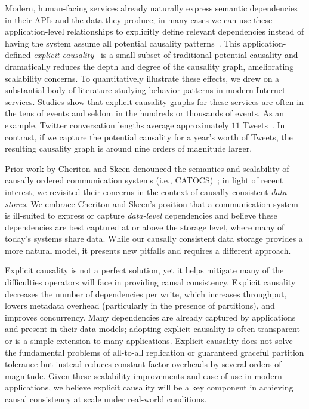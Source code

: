 Modern, human-facing services already naturally express semantic
dependencies in their APIs and the data they produce; in many cases we
can use these application-level relationships to explicitly define
relevant dependencies instead of having the system assume all
potential causality patterns~\cite{explicit-socc}. This
application-defined \textit{explicit
  causality}~\cite{catocs,lazyreplication,fekete99} is a small subset
of traditional potential causality and dramatically reduces the depth
and degree of the causality graph, ameliorating scalability
concerns. To quantitatively illustrate these effects, we drew on a
substantial body of literature studying behavior patterns in modern
Internet services. Studies show that explicit causality graphs for
these services are often in the tens of events and seldom in the
hundreds or thousands of events. As an example, Twitter conversation
lengths average approximately $11$ Tweets~\cite{ritter-twitter-study,
  ye-twitter-study}. In contrast, if we capture the potential
causality for a year's worth of Tweets, the resulting causality graph
is around nine orders of magnitude larger.

Prior work by Cheriton and Skeen denounced the semantics and
scalability of causally ordered communication systems (i.e.,
CATOCS)~\cite{birman-response, catocs}; in light of recent interest,
we revisited their concerns in the context of causally consistent
\textit{data stores}. We embrace Cheriton and Skeen's position that a
communication system is ill-suited to express or capture
\textit{data-level} dependencies and believe these dependencies are
best captured at or above the storage level, where many of today's
systems share data.  While our causally consistent data storage
provides a more natural model, it presents new pitfalls and requires a
different approach.

Explicit causality is not a perfect solution, yet it helps mitigate
many of the difficulties operators will face in providing causal
consistency. Explicit causality decreases the number of dependencies
per write, which increases throughput, lowers metadata overhead
(particularly in the presence of partitions), and improves
concurrency. Many dependencies are already captured by applications
and present in their data models; adopting explicit causality is often
transparent or is a simple extension to many applications. Explicit
causality does not solve the fundamental problems of all-to-all
replication or guaranteed graceful partition tolerance but instead
reduces constant factor overheads by several orders of
magnitude. Given these scalability improvements and ease of use in
modern applications, we believe explicit causality will be a key
component in achieving causal consistency at scale under real-world
conditions.

